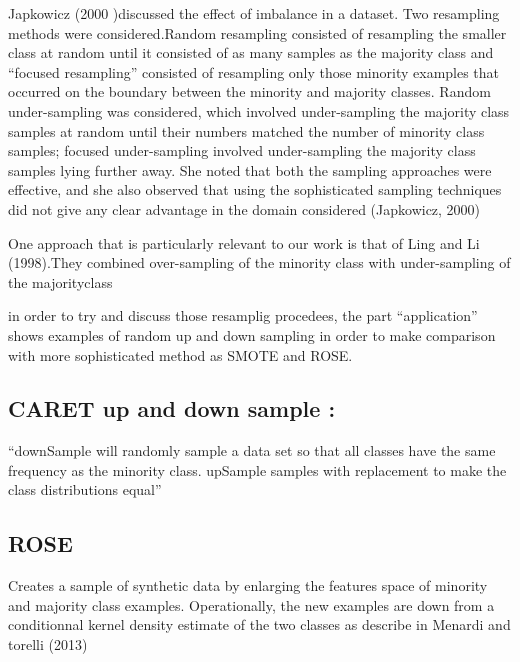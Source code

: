 \documentclass[
]{report}
\begin{document}
Japkowicz (2000 )discussed the effect of imbalance in a dataset. Two resampling methods were considered.Random resampling consisted of resampling the smaller class at random until it consisted of as many samples as the majority class and ``focused resampling'' consisted of resampling only those minority examples that occurred on the boundary between the minority and majority classes. Random under-sampling was considered, which involved under-sampling the majority class samples at random until their numbers matched the number of minority class samples; focused under-sampling involved under-sampling the majority class samples lying further away. She noted that both the sampling approaches were effective, and she also observed that using the sophisticated sampling techniques did not give any clear advantage in the domain considered (Japkowicz, 2000)

One approach that is particularly relevant to our work is that of Ling and Li (1998).They combined over-sampling of the minority class with under-sampling of the majorityclass

in order to try and discuss those resamplig procedees, the part ``application'' shows examples of random up and down sampling in order to make comparison with more sophisticated method as SMOTE and ROSE.

\hypertarget{caret-up-and-down-sample}{%
\subsection{CARET up and down sample :}\label{caret-up-and-down-sample}}

``downSample will randomly sample a data set so that all classes have the same frequency as the minority class. upSample samples with replacement to make the class distributions equal''

\hypertarget{rose}{%
\subsection{ROSE}\label{rose}}

Creates a sample of synthetic data by enlarging the features space of minority and majority class examples. Operationally, the new examples are down from a conditionnal kernel density estimate of the two classes as describe in Menardi and torelli (2013)
\end{document}
